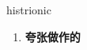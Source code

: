 
\begin{frame}
{\huge histrionic}
\begin{center}
\begin{enumerate}\Large
  \item \textbf{夸张做作的}
\end{enumerate}
\end{center}
\end{frame}
